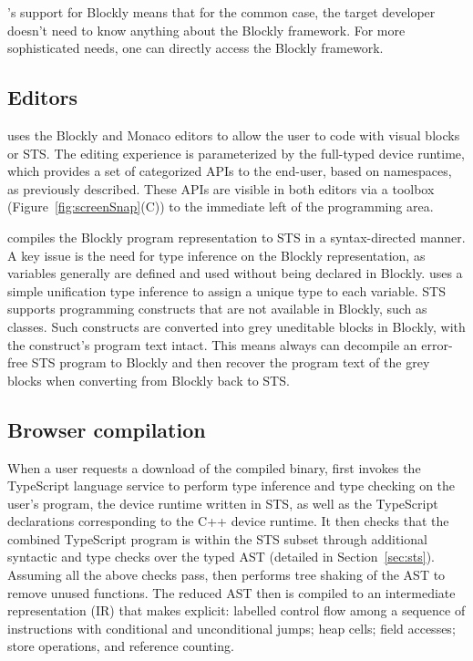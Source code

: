 \MCN's support for Blockly means that for the common case, the \MC target developer doesn't need
to know anything about the Blockly framework.
For more sophisticated needs, one can directly access the Blockly framework.

\subsection{Editors}

\MC uses the Blockly and Monaco editors to allow the user to code with
visual blocks or STS. The editing experience is parameterized by the full-typed device
runtime, which provides a set of categorized APIs to the end-user, based on namespaces, as
previously described. These APIs are visible in both editors via a toolbox (Figure~\ref{fig:screenSnap}(C)) to the immediate left of the programming area.

\MC compiles the Blockly program representation to STS in a syntax-directed manner.
A key issue is the need for type inference on the Blockly representation, as variables generally are defined and used without
being declared in Blockly. \MC uses a simple unification type inference to assign a
unique type to each variable.
STS supports programming constructs that are not available in Blockly, such as classes.
Such constructs are converted into grey uneditable blocks in Blockly, with the construct's program
text intact. This means \MC always can decompile an error-free STS program to Blockly and then recover
the program text of the grey blocks when converting from Blockly back to STS.

\subsection{Browser compilation}

When a user requests a download of the compiled binary, \MC first invokes the TypeScript language service to perform type inference and type checking on the
user's program, the device runtime written in STS, as well as the TypeScript declarations
corresponding to the C++ device runtime. It then checks that the
combined TypeScript program is within the STS subset through additional syntactic and type checks over the typed AST (detailed in Section~\ref{sec:sts}).  Assuming all the
above checks pass, \MC then performs tree shaking of the AST to remove unused functions.
The reduced AST then is compiled to an intermediate representation (IR) that makes explicit: labelled control
flow among a sequence of instructions with conditional and unconditional jumps; heap cells; field accesses; store operations,
and reference counting.

